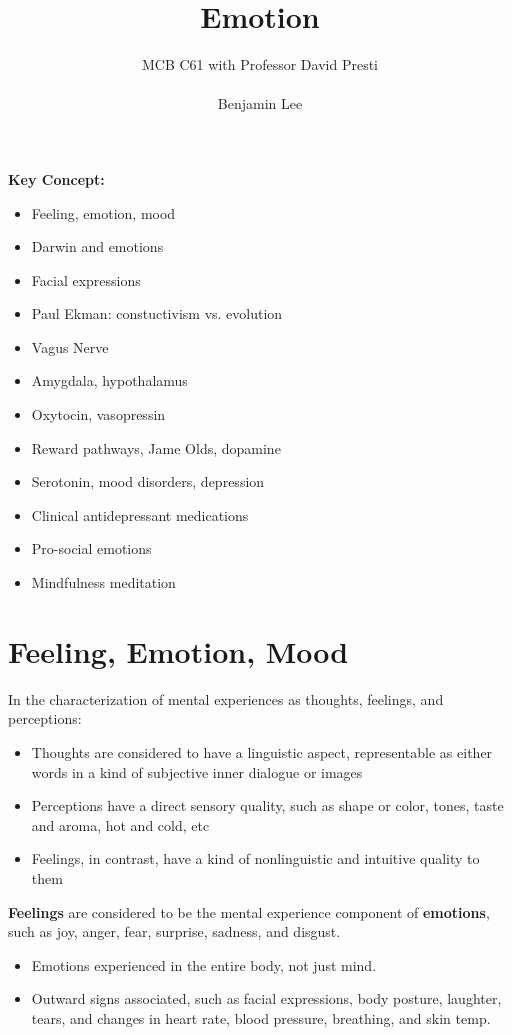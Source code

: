 \documentclass{article}
\title{Emotion}
\author{MCB C61 with Professor David Presti \\ \\ Benjamin Lee}
\begin{document}
\maketitle

\textbf{Key Concept:}
\begin{itemize}
    \item Feeling, emotion, mood
    \item Darwin and emotions
    \item Facial expressions
    \item Paul Ekman: constuctivism vs. evolution
    \item Vagus Nerve
    \item Amygdala, hypothalamus
    \item Oxytocin, vasopressin
    \item Reward pathways, Jame Olds, dopamine
    \item Serotonin, mood disorders, depression
    \item Clinical antidepressant medications
    \item Pro-social emotions
    \item Mindfulness meditation
\end{itemize}

\newpage

\section{Feeling, Emotion, Mood}
In the characterization of mental experiences as thoughts, feelings, and perceptions:
\begin{itemize}
    \item Thoughts are considered to have a linguistic aspect, representable as either words in a kind of subjective inner dialogue or images 
    \item Perceptions have a direct sensory quality, such as shape or color, tones, taste and aroma, hot and cold, etc
    \item Feelings, in contrast, have a kind of nonlinguistic and intuitive quality to them 
\end{itemize}

\noindent \textbf{Feelings} are considered to be the mental experience component of \textbf{emotions}, such as joy, anger, fear, surprise, sadness, and disgust. 
\begin{itemize}
    \item Emotions experienced in the entire body, not just mind. 
    \item Outward signs associated, such as facial expressions, body posture, laughter, tears, and changes in heart rate, blood pressure, breathing, and skin temp. 
\end{itemize}
\end{document}
